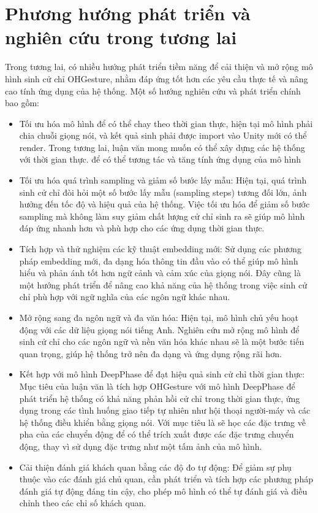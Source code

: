 \section{Phương hướng phát triển và nghiên cứu trong tương lai}


Trong tương lai, có nhiều hướng phát triển tiềm năng để cải thiện và mở rộng mô hình sinh cử chỉ OHGesture, nhằm đáp ứng tốt hơn các yêu cầu thực tế và nâng cao tính ứng dụng của hệ thống. Một số hướng nghiên cứu và phát triển chính bao gồm:

\begin{itemize}
	\item Tối ưu hóa mô hình để có thể chay theo thời gian thực, hiện tại mô hình phải chia chuỗi giọng nói, và kết quả sinh phải được  import vào Unity mới có thể render. Trong tương lai, luận văn mong muốn có thể xây dựng các hệ thống với thời gian thực. để có thể tương tác và tăng tính ứng dụng của mô hình
	
	\item Tối ưu hóa quá trình sampling và giảm số bước lấy mẫu: Hiện tại, quá trình sinh cử chỉ đòi hỏi một số bước lấy mẫu (sampling steps) tương đối lớn, ảnh hưởng đến tốc độ và hiệu quả của hệ thống. Việc tối ưu hóa để giảm số bước sampling mà không làm suy giảm chất lượng cử chỉ sinh ra sẽ giúp mô hình đáp ứng nhanh hơn và phù hợp cho các ứng dụng thời gian thực.
	
	\item Tích hợp và thử nghiệm các kỹ thuật embedding mới: Sử dụng các phương pháp embedding mới, đa dạng hóa thông tin đầu vào có thể giúp mô hình hiểu và phản ánh tốt hơn ngữ cảnh và cảm xúc của giọng nói. Đây cũng là một hướng phát triển để nâng cao khả năng của hệ thống trong việc sinh cử chỉ phù hợp với ngữ nghĩa của các ngôn ngữ khác nhau.
	
	\item Mở rộng sang đa ngôn ngữ và đa văn hóa: Hiện tại, mô hình chủ yếu hoạt động với các dữ liệu giọng nói tiếng Anh. Nghiên cứu mở rộng mô hình để sinh cử chỉ cho các ngôn ngữ và nền văn hóa khác nhau sẽ là một bước tiến quan trọng, giúp hệ thống trở nên đa dạng và ứng dụng rộng rãi hơn.
	
	\item Kết hợp với mô hình DeepPhase \cite{starke2022deepphase} để đạt hiệu quả sinh cử chỉ thời gian thực: Mục tiêu của luận văn là tích hợp OHGesture với mô hình DeepPhase để phát triển hệ thống có khả năng phản hồi cử chỉ trong thời gian thực, ứng dụng trong các tình huống giao tiếp tự nhiên như hội thoại người-máy và các hệ thống điều khiển bằng giọng nói. Với mục tiêu là sẽ học các đặc trưng về pha của các chuyển động để có thể trích xuất được các đặc trưng chuyển động, thay vì sử dụng đặc trưng như một tấm ảnh của mô hình.
	
	
	\item Cải thiện đánh giá khách quan bằng các độ đo tự động: Để giảm sự phụ thuộc vào các đánh giá chủ quan, cần phát triển và tích hợp các phương pháp đánh giá tự động đáng tin cậy, cho phép mô hình có thể tự đánh giá và điều chỉnh theo các chỉ số khách quan.
	\end{itemize}
